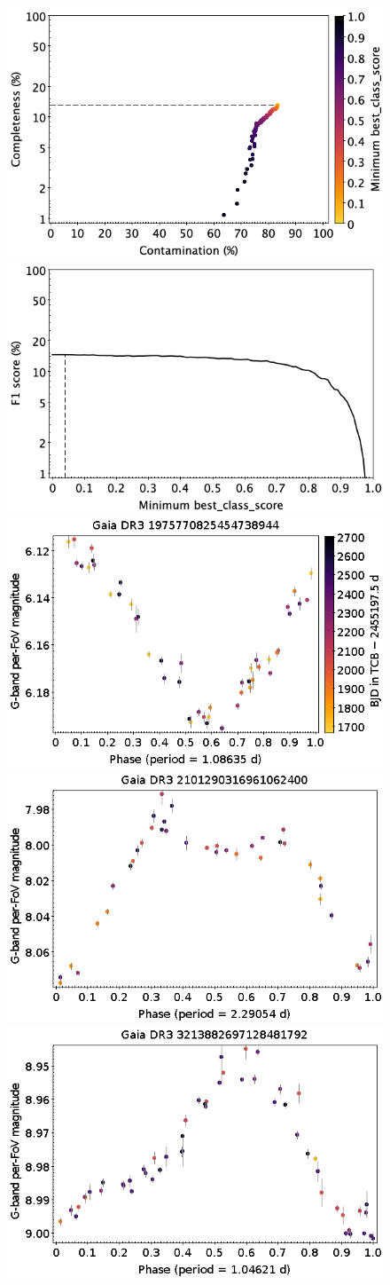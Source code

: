 \documentclass[longauth]{aa}
\begin{document}
\begin{appendix}
\begin{figure}
\centering
{} \includegraphics[width=0.45\hsize]{figures/appendix/ACV_cls_scc.png}  
\hspace{2mm}
 \includegraphics[width=0.45\hsize]{figures/appendix/ACV_cls_sf1.png} \\
\vspace{4mm}
 \includegraphics[width=0.45\hsize]{figures/appendix/ACV-9.png}  
\hspace{2mm}
 \includegraphics[width=0.45\hsize]{figures/appendix/ACV-12.png} \\
\vspace{4mm}
 \includegraphics[width=0.45\hsize]{figures/appendix/ACV-49.png}  

\end{figure}
\end{appendix}
\end{document}
